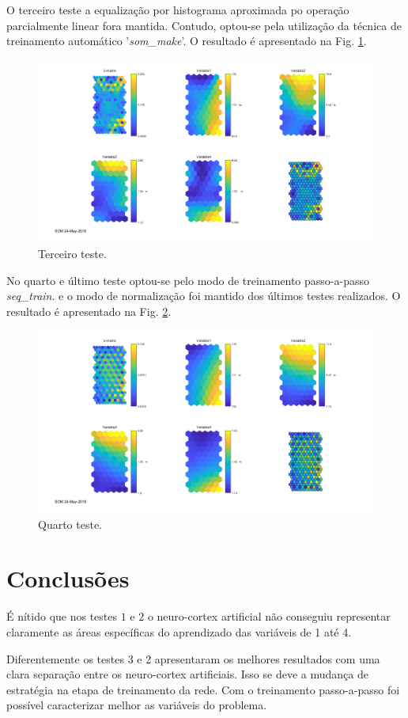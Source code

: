 \documentclass[journal, a4paper]{IEEEtran}
\begin{document}
O terceiro teste a equalização por histograma aproximada po operação parcialmente linear fora mantida. Contudo, optou-se pela utilização da técnica de treinamento automático  '\textit{som\_make}'. O resultado é apresentado na Fig. \ref{SOM3}.


\begin{figure}
	\centering
	\includegraphics[scale=0.5]{Images/SOM3.png}
	\caption{Terceiro teste.}
	\label{SOM3}
\end{figure}

No quarto e último teste optou-se pelo modo de treinamento passo-a-passo \textit{seq\_train}. e o modo de normalização foi mantido dos últimos testes realizados. O resultado é apresentado na Fig. \ref{SOM4}.

\begin{figure}
	\centering
	\includegraphics[scale=0.5]{Images/SOM4.png}
	\caption{Quarto teste.}
	\label{SOM4}
\end{figure}

\section{Conclusões}

É nítido que nos testes $1$ e $2$ o neuro-cortex artificial não conseguiu representar claramente as áreas específicas do aprendizado das variáveis de 1 até 4. 

Diferentemente os testes 3 e 2 apresentaram os melhores resultados com uma clara separação entre os neuro-cortex artificiais. Isso se deve a mudança de estratégia na etapa de treinamento da rede. Com o treinamento passo-a-passo foi possível caracterizar melhor as variáveis do problema. 








\end{document}
